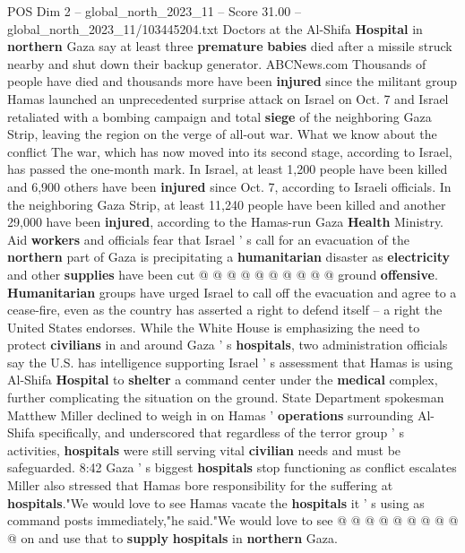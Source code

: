 \begin{textsample}{POS Dim 2 – global\_north\_2023\_11 – Score 31.00 – global\_north\_2023\_11/103445204.txt}  \label{ex:f2_pos_232}
Doctors at the Al-Shifa \textbf{Hospital} in \textbf{northern} Gaza say at least three \textbf{premature} \textbf{babies} died after a missile struck nearby and shut down their backup generator.
ABCNews.com Thousands of people have died and thousands more have been \textbf{injured} since the militant group Hamas launched an unprecedented surprise attack on Israel on Oct. 7 and Israel retaliated with a bombing campaign and total \textbf{siege} of the neighboring Gaza Strip, leaving the region on the verge of all-out war.
What we know about the conflict The war, which has now moved into its second stage, according to Israel, has passed the one-month mark.
In Israel, at least 1,200 people have been killed and 6,900 others have been \textbf{injured} since Oct. 7, according to Israeli officials.
In the neighboring Gaza Strip, at least 11,240 people have been killed and another 29,000 have been \textbf{injured}, according to the Hamas-run Gaza \textbf{Health} Ministry.
Aid \textbf{workers} and officials fear that Israel ' s call for an evacuation of the \textbf{northern} part of Gaza is precipitating a \textbf{humanitarian} disaster as \textbf{electricity} and other \textbf{supplies} have been cut @ @ @ @ @ @ @ @ @ @ ground \textbf{offensive}. \textbf{Humanitarian} groups have urged Israel to call off the evacuation and agree to a cease-fire, even as the country has asserted a right to defend itself -- a right the United States endorses.
While the White House is emphasizing the need to protect \textbf{civilians} in and around Gaza ' s \textbf{hospitals}, two administration officials say the U.S. has intelligence supporting Israel ' s assessment that Hamas is using Al-Shifa \textbf{Hospital} to \textbf{shelter} a command center under the \textbf{medical} complex, further complicating the situation on the ground.
State Department spokesman Matthew Miller declined to weigh in on Hamas ' \textbf{operations} surrounding Al-Shifa specifically, and underscored that regardless of the terror group ' s activities, \textbf{hospitals} were still serving vital \textbf{civilian} needs and must be safeguarded. 8:42 Gaza ' s biggest \textbf{hospitals} stop functioning as conflict escalates Miller also stressed that Hamas bore responsibility for the suffering at \textbf{hospitals}."We would love to see Hamas vacate the \textbf{hospitals} it ' s using as command posts immediately,"he said."We would love to see @ @ @ @ @ @ @ @ @ @ on and use that to \textbf{supply} \textbf{hospitals} in \textbf{northern} Gaza.

\end{textsample}
